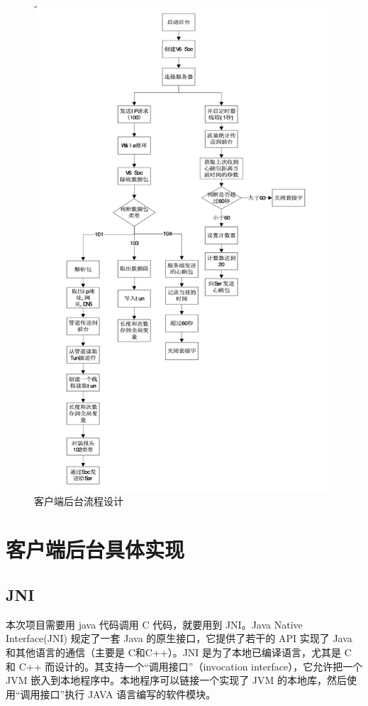 \begin{figure}[!ht]
	\begin{center}
	\includegraphics[scale=.58]{back.png}
	\end{center}
	\caption{客户端后台流程设计}
	\label{figure:客户端后台流程设计}
\end{figure}


\section{客户端后台具体实现}
\subsection{JNI}
本次项目需要用 java 代码调用 C 代码，就要用到 JNI。Java Native Interface(JNI) 规定了一套 Java 的原生接口，它提供了若干的 API 实现了 Java 和其他语言的通信（主要是 C和C++）。JNI 是为了本地已编译语言，尤其是 C 和 C++ 而设计的。其支持一个“调用接口”（invocation interface），它允许把一个 JVM 嵌入到本地程序中。本地程序可以链接一个实现了 JVM 的本地库，然后使用“调用接口”执行 JAVA 语言编写的软件模块。
